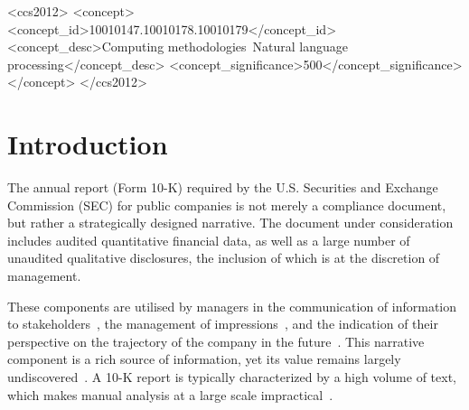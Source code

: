 \documentclass[sigconf]{acmart}
\begin{document}
\begin{CCSXML}
<ccs2012>
   <concept>
       <concept_id>10010147.10010178.10010179</concept_id>
       <concept_desc>Computing methodologies~Natural language processing</concept_desc>
       <concept_significance>500</concept_significance>
       </concept>
 </ccs2012>
\end{CCSXML}



\maketitle

\section{Introduction}

The annual report (Form 10-K) required by the U.S. Securities and Exchange Commission (SEC) for public companies is not merely a compliance document, but rather a strategically designed narrative. The document under consideration includes audited quantitative financial data, as well as a large number of unaudited qualitative disclosures, the inclusion of which is at the discretion of management. 

These components are utilised by managers in the communication of information to stakeholders~\cite{healy2001information, loughran2016textual}, the management of impressions~\cite{brennan2022discretionary, leung2015impression}, and the indication of their perspective on the trajectory of the company in the future~\cite{call2024corporate}. This narrative component is a rich source of information, yet its value remains largely undiscovered~\cite{balakrishnan2010predictive}. A 10-K report is typically characterized by a high volume of text, which makes manual analysis at a large scale impractical~\cite{loughran2011liability, loughran2016textual, bassyouny2022narrative}.
\end{document}
